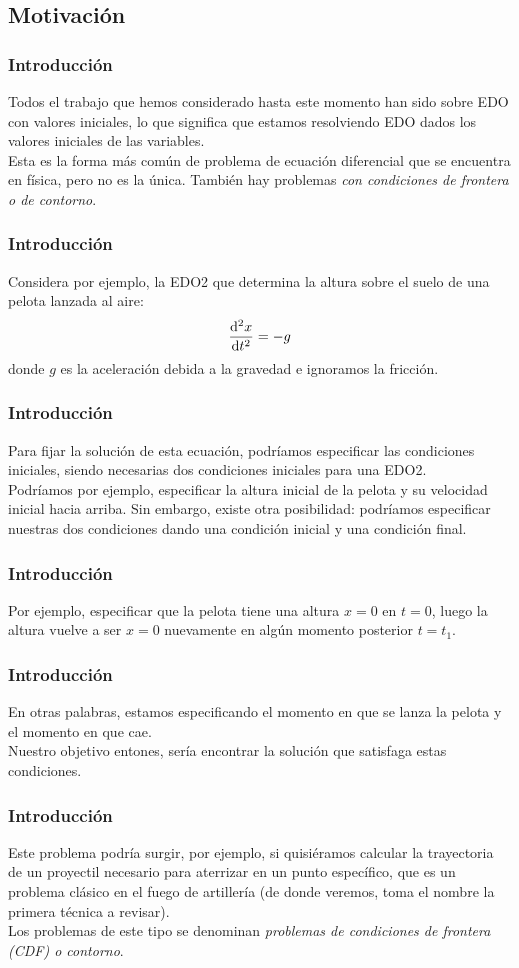 \subsection{Motivación}
\begin{frame}
\frametitle{Introducción}
Todos el trabajo que hemos considerado hasta este momento han sido sobre EDO con valores iniciales, lo que significa que estamos resolviendo EDO dados los valores iniciales de las variables.
\\
\bigskip
Esta es la forma más común de problema de ecuación diferencial que se encuentra en física, pero no es la única. También hay problemas \emph{con condiciones de frontera o de contorno}.
\end{frame}
\begin{frame}
\frametitle{Introducción}
Considera por ejemplo, la EDO2 que determina la altura sobre el suelo de una pelota lanzada al aire:
\begin{align}
\dv[2]{x}{t} = - g
\label{eq:ecuacion_08_105}
\end{align}
donde $g$ es la aceleración debida a la gravedad e ignoramos la fricción.
\end{frame}
\begin{frame}
\frametitle{Introducción}
Para fijar la solución de esta ecuación, podríamos especificar las condiciones iniciales, siendo necesarias dos condiciones iniciales para una EDO2.
\\
\bigskip
Podríamos por ejemplo, especificar la altura inicial de la pelota y su velocidad inicial hacia arriba. Sin embargo, existe otra posibilidad: podríamos especificar nuestras dos condiciones dando una condición inicial y una condición final.
\end{frame}
\begin{frame}
\frametitle{Introducción}
Por ejemplo, especificar que la pelota tiene una altura $x = 0$ en $t = 0$, luego la altura vuelve a ser $x = 0$ nuevamente en algún momento posterior $t = t_{1}$.
\end{frame}
\begin{frame}
\frametitle{Introducción}
En otras palabras, estamos especificando el momento en que se lanza la pelota y el momento en que cae.
\\
\bigskip
Nuestro objetivo entones, sería encontrar la solución que satisfaga estas condiciones.
\end{frame}
\begin{frame}
\frametitle{Introducción}
Este problema podría surgir, por ejemplo, si quisiéramos calcular la trayectoria de un proyectil necesario para aterrizar en un punto específico, que es un problema clásico en el fuego de artillería (de donde veremos, toma el nombre la primera técnica a revisar).
\\
\bigskip
Los problemas de este tipo se denominan \emph{problemas de condiciones de frontera (CDF) o contorno}.
\end{frame}
